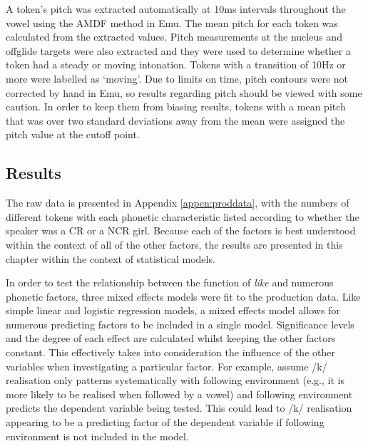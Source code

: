 A token's pitch was extracted automatically at 10ms intervals throughout the vowel using the AMDF method in Emu.  The mean pitch for each token was calculated from the extracted values.  Pitch measurements at the nucleus and offglide targets were also extracted and they were used to determine whether a token had a steady or moving intonation.  Tokens with a transition of 10Hz or more were labelled as `moving'.  Due to limits on time, pitch contours were not corrected by hand in Emu, so results regarding pitch should be viewed with some caution.  In order to keep them from biasing results, tokens with a mean pitch that was over two standard deviations away from the mean were assigned the pitch value at the cutoff point. 



\subsection{Results}\label{sec:prodresults}

The raw data is presented in Appendix \ref{appen:proddata}, with the numbers of different tokens with each phonetic characteristic listed according to whether the speaker was a CR or a NCR girl.  Because each of the factors is best understood within the context of all of the other factors, the results are presented in this chapter within the context of statistical models.

In order to test the relationship between the function of \textit{like} and numerous phonetic factors, three mixed effects models were fit to the production data.  Like simple linear and logistic regression models, a mixed effects model allows for numerous predicting factors to be included in a single model.  Significance levels and the degree of each effect are calculated whilst keeping the other factors constant.  This effectively takes into consideration the influence of the other variables when investigating a particular factor.  For example, assume /k/ realisation only patterns systematically with following environment (e.g., it is more likely to be realised when followed by a vowel) and following environment predicts the dependent variable being tested.  This could lead to /k/ realisation appearing to be a predicting factor of the dependent variable if following environment is not included in the model. 

